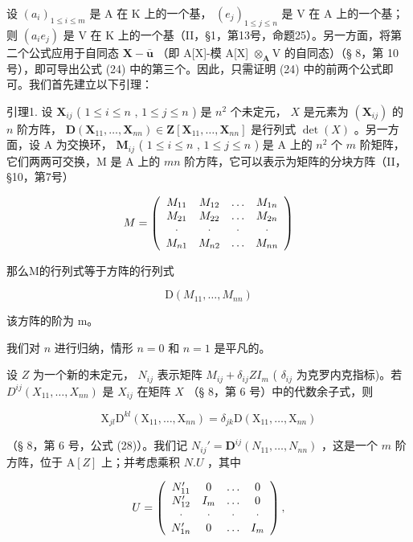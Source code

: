 设 \((a_{i})_{1\leqslant i\leqslant m}\) 是 A 在 K 上的一个基， \((e_{j})_{1\leqslant j\leqslant n}\) 是 V 在 A 上的一个基；则 \((a_{i}e_{j})\) 是 V 在 K 上的一个基（II，§1，第13号，命题25）。另一方面，将第二个公式应用于自同态 \(\mathbf{X} - \bar{\boldsymbol{u}}\) （即 A{[}X{]}-模 A{[}X{]} \(\otimes_{\mathbf{A}}\mathrm{V}\) 的自同态）（§ 8，第 10 号），即可导出公式 (24) 中的第三个。因此，只需证明 (24) 中的前两个公式即可。我们首先建立以下引理：

引理1. 设 \(\mathbf{X}_{ij}\) ( \(1 \leqslant i \leqslant n\) , \(1 \leqslant j \leqslant n\) ) 是 \(n^2\) 个未定元， \(X\) 是元素为 \((\mathbf{X}_{ij})\) 的 \(n\) 阶方阵， \(\mathbf{D}(\mathbf{X}_{11}, \ldots, \mathbf{X}_{nn}) \in \mathbf{Z}[\mathbf{X}_{11}, \ldots, \mathbf{X}_{nn}]\) 是行列式 \(\det(X)\) 。另一方面，设 A 为交换环， \(\mathbf{M}_{ij}\) ( \(1 \leqslant i \leqslant n\) , \(1 \leqslant j \leqslant n\) ) 是 A 上的 \(n^2\) 个 \(m\) 阶矩阵，它们两两可交换，M 是 A 上的 \(mn\) 阶方阵，它可以表示为矩阵的分块方阵（II，§10，第7号）

\[
M = \left( \begin{array}{c c c c} M _ {1 1} & M _ {1 2} & \ldots & M _ {1 n} \\ M _ {2 1} & M _ {2 2} & \ldots & M _ {2 n} \\ \cdot & \cdot & \cdot & \cdot \\ M _ {n 1} & M _ {n 2} & \ldots & M _ {n n} \end{array} \right)
\]

那么M的行列式等于方阵的行列式

\[
\mathrm{D} (M _ {1 1}, \dots , M _ {n n})
\]

该方阵的阶为 m。

我们对 \(n\) 进行归纳，情形 \(n = 0\) 和 \(n = 1\) 是平凡的。

设 \(Z\) 为一个新的未定元， \(N_{ij}\) 表示矩阵 \(M_{ij} + \delta_{ij}ZI_m\) ( \(\delta_{ij}\) 为克罗内克指标)。若 \(D^{ij}(X_{11},\ldots,X_{nn})\) 是 \(X_{ij}\) 在矩阵 \(X\) （§ 8，第 6 号）中的代数余子式，则

\[
\mathrm{X} _ {j l} \mathrm{D} ^ {k l} (\mathrm{X} _ {1 1}, \dots , \mathrm{X} _ {n n}) = \delta_ {j k} \mathrm{D} (\mathrm{X} _ {1 1}, \dots , \mathrm{X} _ {n n})\tag{25}
\]

（§ 8，第 6 号，公式 (28)）。我们记 \(N_{ij}' = \mathbf{D}^{ij}(N_{11}, \ldots, N_{nn})\) ，这是一个 \(m\) 阶方阵，位于 \(\mathrm{A}[Z]\) 上；并考虑乘积 \(N.U\) ，其中

\[
U = \left( \begin{array}{c c c c} N _ {1 1} ^ {\prime} & 0 & \ldots & 0 \\ N _ {1 2} ^ {\prime} & I _ {m} & \ldots & 0 \\ \cdot & \cdot & \cdot & \cdot \\ N _ {1 n} ^ {\prime} & 0 & \ldots & I _ {m} \end{array} \right),
\]

